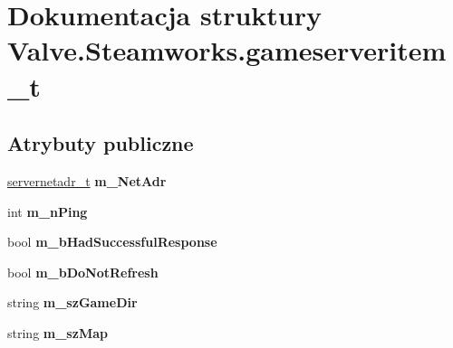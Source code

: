 \hypertarget{struct_valve_1_1_steamworks_1_1gameserveritem__t}{}\section{Dokumentacja struktury Valve.\+Steamworks.\+gameserveritem\+\_\+t}
\label{struct_valve_1_1_steamworks_1_1gameserveritem__t}
\subsection*{Atrybuty publiczne}
\begin{DoxyCompactItemize}
\item 
\mbox{\label{struct_valve_1_1_steamworks_1_1gameserveritem__t_a0615f865a0dca410f72a32771943315a}} 
\hyperlink{struct_valve_1_1_steamworks_1_1servernetadr__t}{servernetadr\+\_\+t} {\bfseries m\+\_\+\+Net\+Adr}
\item 
\mbox{\label{struct_valve_1_1_steamworks_1_1gameserveritem__t_a3effb9d4c0b04cb10e9e96a8c0b64c9f}} 
int {\bfseries m\+\_\+n\+Ping}
\item 
\mbox{\label{struct_valve_1_1_steamworks_1_1gameserveritem__t_a1b943466cd83b9b1bdc516ad65ed3dc7}} 
bool {\bfseries m\+\_\+b\+Had\+Successful\+Response}
\item 
\mbox{\label{struct_valve_1_1_steamworks_1_1gameserveritem__t_a40f19606d3d09ca0a71308bf3a742b6f}} 
bool {\bfseries m\+\_\+b\+Do\+Not\+Refresh}
\item 
\mbox{\label{struct_valve_1_1_steamworks_1_1gameserveritem__t_a49df12fa85b0c5c97f58caccda872236}} 
string {\bfseries m\+\_\+sz\+Game\+Dir}
\item 
\mbox{\label{struct_valve_1_1_steamworks_1_1gameserveritem__t_aa3f641c1e3e3ac2e86230585b9997cd5}} 
string {\bfseries m\+\_\+sz\+Map}
\item 
\mbox{\label{struct_valve_1_1_steamworks_1_1gameserveritem__t_a3597b65b5538fc4617b149f5ffe896df}} 

\end{DoxyCompactItemize}
